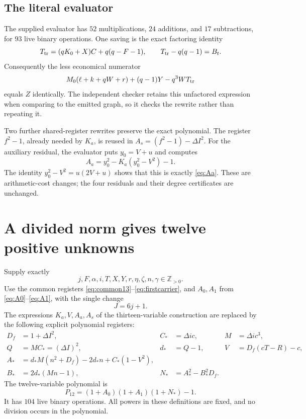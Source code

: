 \documentclass[11pt,a4paper]{article}
\theoremstyle{definition}
\theoremstyle{remark}
\newcommand{\Zpos}{\mathbb Z_{>0}}
\begin{document}
\subsection{The literal evaluator}

The supplied evaluator has \(52\) multiplications, \(24\) additions, and
\(17\) subtractions, for \(93\) live binary operations.
One saving is the exact factoring identity
\[
 T_{\rm tr}=(qK_0+X)C+q(q-F-1),\qquad
 T_{\rm tr}-q(q-1)=B_t.
\]
Consequently the less economical numerator
\[
 M_0(\ell+k+qW+r)+(q-1)Y-q^3WT_{\rm tr}
\]
equals \(Z\) identically. The independent checker retains this unfactored
expression when comparing to the emitted graph, so it checks the rewrite
rather than repeating it.

Two further shared-register rewrites preserve the exact polynomial.
The register \(f^2-1\), already needed by \(K_a\), is reused in
\(A_s=(f^2-1)-\Delta I^2\). For the auxiliary residual, the evaluator
puts \(y_0=V+u\) and computes
\[
 A_a=y_0^2-K_a(y_0^2-V^2)-1.
\]
The identity \(y_0^2-V^2=u(2V+u)\) shows that this is exactly
\eqref{eq:Aa}. These are arithmetic-cost changes; the four residuals
and their degree certificates are unchanged.

\section{A divided norm gives twelve positive unknowns}
\label{sec:p12}

Supply exactly
\begin{equation}
 j,F,\alpha,i,T,X,Y,r,\eta,\zeta,n,\gamma\in\Zpos.
                                                        \label{eq:vars12}
\end{equation}
Use the common registers \eqref{eq:common13}--\eqref{eq:firstcarrier},
and \(A_0,A_1\) from \eqref{eq:A0}--\eqref{eq:A1}, with the single
change
\begin{equation}
 J=6j+1.                                    \label{eq:J12}
\end{equation}
The expressions \(K_a,V,A_a,A_s\) of the thirteen-variable construction
are replaced by the following explicit polynomial registers:
\begin{align}
 D_f&=1+\Delta I^2,&
 C_*&=\Delta ic,& M&=\Delta ic^3, \nonumber\\
 Q&=MC_*=(\Delta I)^2,& d_*&=Q-1,&
 V&=D_f(cT-R)-c,                             \label{eq:norm12reg}\\
 A_*&=d_*M(n^2+D_f)-2d_*n+C_*(1-V^2),        \label{eq:Anorm}\\
 B_*&=2d_*(Mn-1),&
 N_*&=A_*^2-B_*^2D_f.                       \label{eq:Nnorm}
\end{align}
The twelve-variable polynomial is
\begin{equation}
 \boxed{P_{12}=(1+A_0)(1+A_1)(1+N_*)-1.}     \label{eq:P12}
\end{equation}
It has \(104\) live binary operations. All powers in these definitions
are fixed, and no division occurs in the polynomial.
\end{document}
